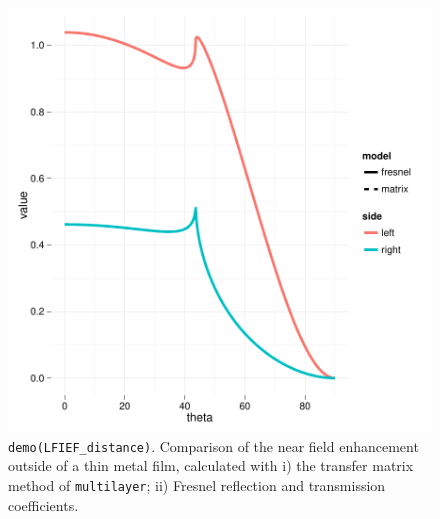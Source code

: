 \documentclass[12pt, a4paper]{article}
\begin{document}
\begin{figure}[!ht]
\centering
\includegraphics{planar-vignette-field_enhancement}
\caption{\texttt{demo(LFIEF\_distance)}. Comparison of the near field enhancement outside of a thin metal film, calculated with i) the transfer matrix method of \texttt{multilayer}; ii) Fresnel reflection and transmission coefficients.}
\label{fig:fieldenhancement}
\end{figure}
\end{document}
